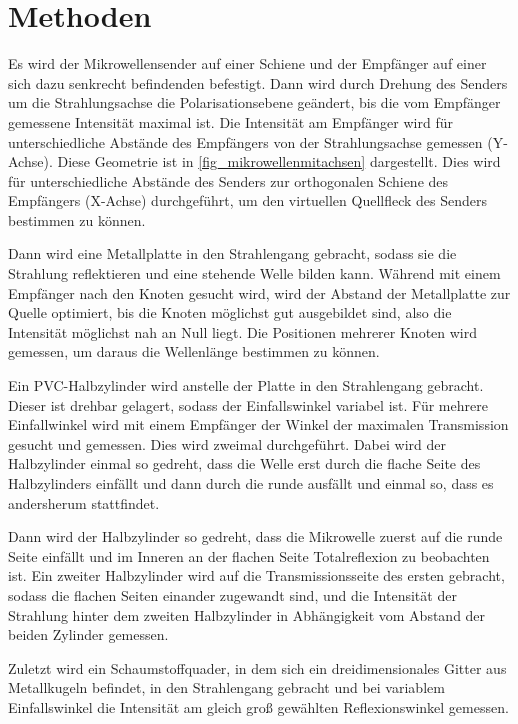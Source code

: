 \documentclass[
	a4paper,
	12pt,
	pagesize,
	ngerman
]{scrartcl}
\begin{document}
	\section{Methoden}
	Es wird der Mikrowellensender auf einer Schiene und der Empfänger auf  einer sich dazu senkrecht befindenden befestigt.
	Dann wird durch Drehung des Senders um die Strahlungsachse die Polarisationsebene geändert, bis die vom Empfänger gemessene Intensität maximal ist.
	Die Intensität am Empfänger wird für unterschiedliche Abstände des Empfängers von der Strahlungsachse gemessen (Y-Achse).
	Diese Geometrie ist in \cref{fig_mikrowellenmitachsen} dargestellt.
	Dies wird für unterschiedliche Abstände des Senders zur orthogonalen Schiene des Empfängers (X-Achse) durchgeführt, um den virtuellen Quellfleck des Senders bestimmen zu können.
	
	Dann wird eine Metallplatte in den Strahlengang gebracht, sodass sie die Strahlung reflektieren und eine stehende Welle bilden kann.
	Während mit einem Empfänger nach den Knoten gesucht wird, wird der Abstand der Metallplatte zur Quelle optimiert, bis die Knoten möglichst gut ausgebildet sind, also die Intensität möglichst nah an Null liegt.
	Die Positionen mehrerer Knoten wird gemessen, um daraus die Wellenlänge bestimmen zu können. %
	
	Ein PVC-Halbzylinder wird anstelle der Platte in den Strahlengang gebracht.
	Dieser ist drehbar gelagert, sodass der Einfallswinkel variabel ist.
	Für mehrere Einfallwinkel wird mit einem Empfänger der Winkel der maximalen Transmission gesucht und gemessen.
	Dies wird zweimal durchgeführt.
	Dabei wird der Halbzylinder einmal so gedreht, dass die Welle erst durch die flache Seite des Halbzylinders einfällt und dann durch die runde ausfällt und einmal so, dass es andersherum stattfindet.
	
	Dann wird der Halbzylinder so gedreht, dass die Mikrowelle zuerst auf die runde Seite einfällt und im Inneren an der flachen Seite Totalreflexion zu beobachten ist. %
	Ein zweiter Halbzylinder wird auf die Transmissionsseite des ersten gebracht, sodass die flachen Seiten einander zugewandt sind, und die Intensität der Strahlung hinter dem zweiten Halbzylinder in Abhängigkeit vom Abstand der beiden Zylinder gemessen.
	
	Zuletzt wird ein Schaumstoffquader, in dem sich ein dreidimensionales Gitter aus Metallkugeln befindet, in den Strahlengang gebracht und bei variablem Einfallswinkel die Intensität am gleich groß gewählten Reflexionswinkel gemessen.
	
\end{document}
